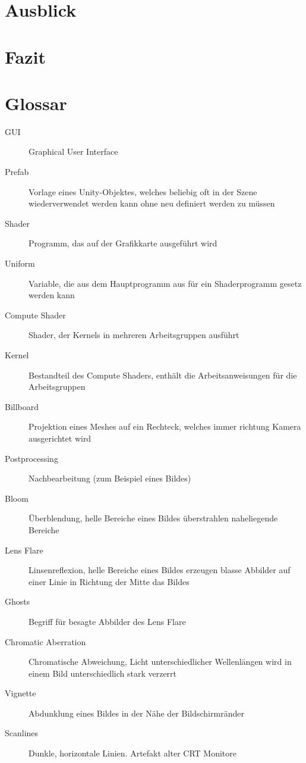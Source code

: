 \documentclass[a4paper,ngerman,12pt]{report}
\begin{document}
\chapter{Ausblick}

\lipsum[3]





\chapter{Fazit}

\lipsum[3]





\chapter{Glossar}

\begin{description}
\item[GUI] Graphical User Interface
\item[Prefab] Vorlage eines Unity-Objektes, welches beliebig oft in der Szene wiederverwendet werden kann ohne neu definiert werden zu müssen
\vspace{5mm}
\item[Shader] Programm, das auf der Grafikkarte ausgeführt wird
\item[Uniform] Variable, die aus dem Hauptprogramm aus für ein Shaderprogramm gesetz werden kann
\item[Compute Shader] Shader, der Kernels in mehreren Arbeitsgruppen ausführt
\item[Kernel] Bestandteil des Compute Shaders, enthält die Arbeitsanweisungen für die Arbeitsgruppen
\item[Billboard] Projektion eines Meshes auf ein Rechteck, welches immer richtung Kamera ausgerichtet wird
\vspace{5mm}
\item[Postprocessing] Nachbearbeitung (zum Beispiel eines Bildes)
\item[Bloom] Überblendung, helle Bereiche eines Bildes überstrahlen naheliegende Bereiche
\item[Lens Flare] Linsenreflexion, helle Bereiche eines Bildes erzeugen blasse Abbilder auf einer Linie in Richtung der Mitte das Bildes
\item[Ghosts] Begriff für besagte Abbilder des Lens Flare
\item[Chromatic Aberration] Chromatische Abweichung, Licht unterschiedlicher Wellenlängen wird in einem Bild unterschiedlich stark verzerrt
\item[Vignette] Abdunklung eines Bildes in der Nähe der Bildschirmränder
\item[Scanlines] Dunkle, horizontale Linien. Artefakt alter CRT Monitore
\end{description}
\end{document}
